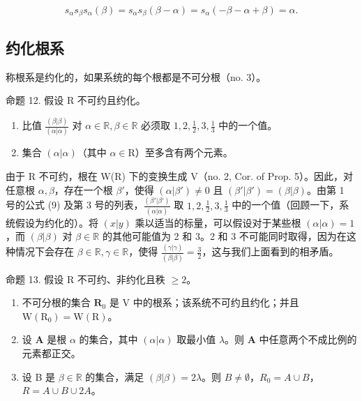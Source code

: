\[
s _ {\alpha} s _ {\beta} s _ {\alpha} (\beta) = s _ {\alpha} s _ {\beta} (\beta - \alpha) = s _ {\alpha} (- \beta - \alpha + \beta) = \alpha .
\]

\subsection{约化根系}

称根系是约化的，如果系统的每个根都是不可分根（no. 3）。

命题 12. 假设 R 不可约且约化。

\begin{enumerate}
\def\labelenumi{(\roman{enumi})}
\item
  比值 \(\frac{(\beta|\beta)}{(\alpha|\alpha)}\) 对 \(\alpha \in \mathbb{R}, \beta \in \mathbb{R}\) 必须取 \(1, 2, \frac{1}{2}, 3, \frac{1}{3}\) 中的一个值。
\item
  集合 \((\alpha |\alpha)\)（其中 \(\alpha \in \mathrm{R}\)）至多含有两个元素。
\end{enumerate}

由于 R 不可约，根在 W(R) 下的变换生成 V（no. 2, Cor. of Prop. 5）。因此，对任意根 \(\alpha, \beta\)，存在一个根 \(\beta'\)，使得 \((\alpha|\beta') \neq 0\) 且 \((\beta'|\beta') = (\beta|\beta)\)。由第 1 号的公式 (9) 及第 3 号的列表，\(\frac{(\beta'|\beta')}{(\alpha|\alpha)}\) 取 \(1, 2, \frac{1}{2}, 3, \frac{1}{3}\) 中的一个值（回顾一下，系统假设为约化的）。将 \((x|y)\) 乘以适当的标量，可以假设对于某些根 \((\alpha|\alpha) = 1\)，而 \((\beta|\beta)\) 对 \(\beta \in \mathbb{R}\) 的其他可能值为 2 和 3。2 和 3 不可能同时取得，因为在这种情况下会存在 \(\beta \in \mathbb{R}, \gamma \in \mathbb{R}\)，使得 \(\frac{(\gamma|\gamma)}{(\beta|\beta)} = \frac{3}{2}\)，这与我们上面看到的相矛盾。

命题 13. 假设 R 不可约、非约化且秩 \(\geqslant 2\)。

\begin{enumerate}
\def\labelenumi{(\roman{enumi})}
\item
  不可分根的集合 \(\mathbf{R}_0\) 是 V 中的根系；该系统不可约且约化；并且 \(\mathrm{W}(\mathrm{R}_0) = \mathrm{W}(\mathrm{R})\)。
\item
  设 \(\mathbf{A}\) 是根 \(\alpha\) 的集合，其中 \((\alpha |\alpha)\) 取最小值 \(\lambda\)。则 \(\mathbf{A}\) 中任意两个不成比例的元素都正交。
\item
  设 B 是 \(\beta \in \mathbb{R}\) 的集合，满足 \((\beta |\beta) = 2\lambda\)。则 \(B \neq \emptyset\)，\(R_0 = A \cup B\)，\(R = A \cup B \cup 2A\)。
\end{enumerate}

